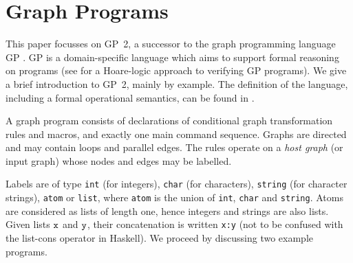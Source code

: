 \section{Graph Programs}
\label{sec:graph-programs}

This paper focusses on GP~2, a successor to the graph programming language GP \cite{Plump09a,Plump12a}.
GP is a domain-specific language which aims to support formal reasoning on programs (see \cite{Poskitt-Plump12a} for a Hoare-logic approach to verifying GP programs). We give a brief introduction to GP~2, mainly by example. The definition of the language, including a formal operational semantics, can be found in \cite{Plump12a}. 

A graph program consists of declarations of conditional graph transformation rules and macros, and exactly one main command sequence. Graphs are directed and may contain  loops and parallel edges. The rules operate on a \emph{host graph}\/ (or input graph) whose nodes and edges may be labelled.

Labels are of type \texttt{int} (for integers), \texttt{char} (for characters), \texttt{string} (for character strings), \texttt{atom} or \texttt{list}, where \texttt{atom} is the union of \texttt{int}, \texttt{char} and \texttt{string}. Atoms are considered as lists of length one, hence integers and strings are also lists. Given lists $\mathtt{x}$ and $\mathtt{y}$, their concatenation is written \texttt{x:y} (not to be confused with the list-cons operator in Haskell). 
We proceed by discussing two example programs.

